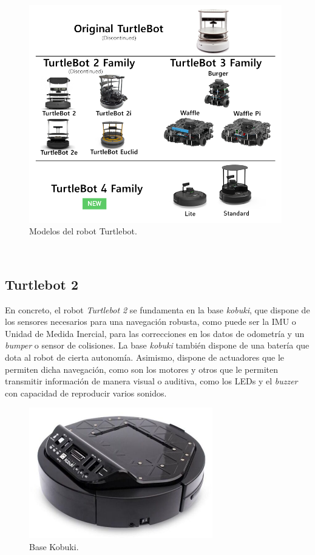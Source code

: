 \begin{figure} [h!]
  \begin{center}
    \includegraphics[width=11cm]{figs/turtlebot_family}
  \end{center}
  \caption{Modelos del robot Turtlebot.}
  \label{fig:turtlebots}
\end{figure}\


\subsection{Turtlebot 2}
\label{sec:turtlebot2}

En concreto, el robot \textit{Turtlebot 2} se fundamenta en la base
\textit{kobuki}, que dispone de los sensores necesarios para una navegación
robusta, como puede ser la IMU o Unidad de Medida Inercial, para las
correcciones en los datos de odometría y un \textit{bumper} o sensor de
colisiones.
La base \textit{kobuki} también dispone de una batería que dota al robot de
cierta autonomía.
Asimismo, dispone de actuadores que le permiten dicha navegación, como son los
motores y otros que le permiten transmitir información de manera visual o
auditiva, como los LEDs y el \textit{buzzer} con capacidad de reproducir varios
sonidos.

\begin{figure} [h!]
  \begin{center}
    \includegraphics[width=8cm]{figs/kobuki_base}
  \end{center}
  \caption{Base Kobuki.}
  \label{fig:base_kobuki}
\end{figure}\

